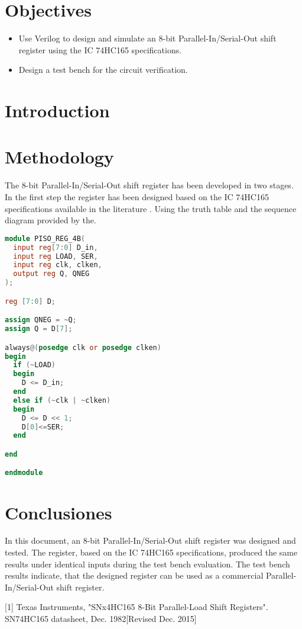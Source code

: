 \documentclass[9pt,technote]{IEEEtran}
\begin{document}
	
	\maketitle
	\section{Objectives}
	\begin{itemize}
		\item Use Verilog to design and simulate an 8-bit Parallel-In/Serial-Out shift register using the IC 74HC165 specifications.
		\item Design a test bench for the circuit verification.
	\end{itemize}
	
	\section{Introduction}
	
		
	\section{Methodology}
	The 8-bit Parallel-In/Serial-Out shift register has been developed in two stages. In the first step the register has been designed based on the IC 74HC165 specifications available in the literature \cite{floyd_fundamentos_nodate}. Using the truth table and the sequence diagram provided by the.
	
	\begin{lstlisting}[language=Verilog, caption={Codigo MATLAB para correlacionar señales de audio.}, label={code:audio_correlation}]
module PISO_REG_4B(
  input reg[7:0] D_in,
  input reg LOAD, SER,
  input reg clk, clken,
  output reg Q, QNEG
);

reg [7:0] D;

assign QNEG = ~Q;
assign Q = D[7];

always@(posedge clk or posedge clken)
begin
  if (~LOAD)
  begin
    D <= D_in;
  end 
  else if (~clk | ~clken)
  begin
    D <= D << 1;
    D[0]<=SER;
  end

end

endmodule
	\end{lstlisting}
	
	
	\section{Conclusiones}
	In this document, an 8-bit Parallel-In/Serial-Out shift register was designed and tested. The register, based on the IC 74HC165 specifications, produced the same results under identical inputs during the test bench evaluation. The test bench results indicate, that the designed register can be used as a commercial Parallel-In/Serial-Out shift register. 
	
	
	
	
	
	
	
	
	
	
	
	[1] Texas Instruments, "SNx4HC165 8-Bit Parallel-Load Shift Registers". SN74HC165 datasheet, Dec. 1982[Revised Dec. 2015]
	
	
	
	
	
	
	
\end{document}
